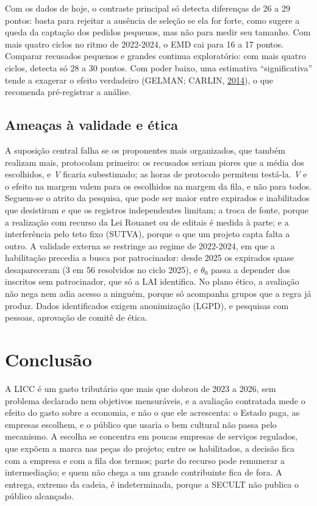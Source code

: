 \documentclass[12pt,a4paper]{article}
\begin{document}
Com os dados de hoje, o contraste principal só detecta diferenças de 26 a 29 pontos: basta para
rejeitar a ausência de seleção se ela for forte, como sugere a queda da captação dos pedidos
pequenos, mas não para medir seu tamanho. Com mais quatro ciclos no ritmo de 2022-2024, o EMD cai
para 16 a 17 pontos. Comparar recusados pequenos e grandes continua exploratório: com mais quatro
ciclos, detecta só 28 a 30 pontos. Com poder baixo, uma estimativa ``significativa'' tende a
exagerar o efeito verdadeiro (GELMAN; CARLIN, \hyperref[ref-gelman-19]{2014}), o que recomenda
pré-registrar a análise.

\subsection{Ameaças à validade e ética}\label{secao-5.5}

A suposição central falha se os proponentes mais organizados, que também realizam mais, protocolam
primeiro: os recusados seriam piores que a média dos escolhidos, e \emph{V} ficaria subestimado; as
horas de protocolo permitem testá-la. \emph{V} e o efeito na margem valem para os escolhidos na
margem da fila, e não para todos. Seguem-se o atrito da pesquisa, que pode ser maior entre expirados
e inabilitados que desistiram e que os registros independentes limitam; a troca de fonte, porque a
realização com recurso da Lei Rouanet ou de editais é medida à parte; e a interferência pelo teto
fixo (SUTVA), porque o que um projeto capta falta a outro. A validade externa se restringe ao regime
de 2022-2024, em que a habilitação precedia a busca por patrocinador: desde 2025 os expirados quase
desapareceram (3 em 56 resolvidos no ciclo 2025), e \(\theta_0\) passa a depender dos inscritos sem
patrocinador, que só a LAI identifica. No plano ético, a avaliação não nega nem adia acesso a
ninguém, porque só acompanha grupos que a regra já produz. Dados identificados exigem anonimização
(LGPD), e pesquisas com pessoas, aprovação de comitê de ética.

\section{Conclusão}\label{secao-6}

A LICC é um gasto tributário que mais que dobrou de 2023 a 2026, sem problema declarado nem
objetivos mensuráveis, e a avaliação contratada mede o efeito do gasto sobre a economia, e não o que
ele acrescenta: o Estado paga, as empresas escolhem, e o público que usaria o bem cultural não passa
pelo mecanismo. A escolha se concentra em poucas empresas de serviços regulados, que expõem a marca
nas peças do projeto; entre os habilitados, a decisão fica com a empresa e com a fila dos termos;
parte do recurso pode remunerar a intermediação; e quem não chega a um grande contribuinte fica de
fora. A entrega, extremo da cadeia, é indeterminada, porque a SECULT não publica o público
alcançado.
\end{document}
